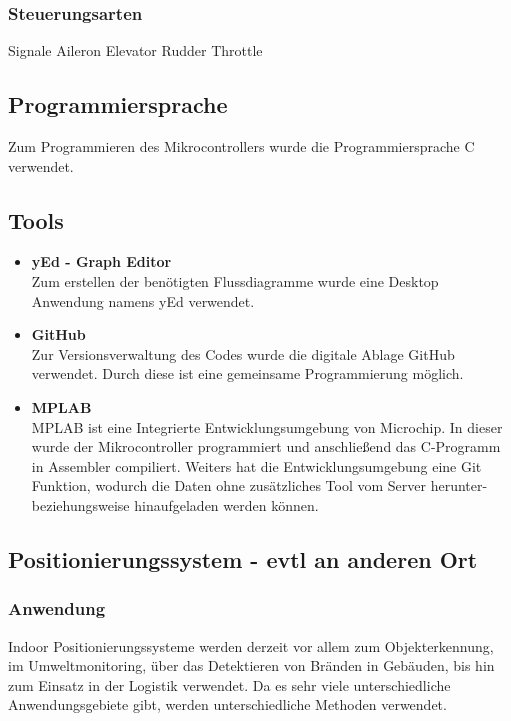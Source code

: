 \begin{itemize}

  \subsubsection{Steuerungsarten} %
  Signale
  Aileron
  Elevator
  Rudder
  Throttle


  \subsection{Programmiersprache}
  Zum Programmieren des Mikrocontrollers wurde die Programmiersprache C verwendet.

  \subsection{Tools}

    \begin{itemize}
      \item \textbf{yEd - Graph Editor}\\
      Zum erstellen der benötigten Flussdiagramme wurde eine Desktop Anwendung namens yEd verwendet.
      \item \textbf{GitHub}\\
      Zur Versionsverwaltung des Codes wurde die digitale Ablage GitHub verwendet. Durch diese ist eine gemeinsame Programmierung möglich.
      \item \textbf{MPLAB}\\
      MPLAB ist eine Integrierte Entwicklungsumgebung von Microchip. In dieser wurde der Mikrocontroller programmiert und anschließend das C-Programm in Assembler compiliert.
      Weiters hat die Entwicklungsumgebung eine Git Funktion, wodurch die Daten ohne zusätzliches Tool vom Server herunter- beziehungsweise hinaufgeladen werden können.
    \end{itemize}


  \subsection{Positionierungssystem - evtl an anderen Ort}

    \subsubsection{Anwendung}
    Indoor Positionierungssysteme werden derzeit vor allem zum Objekterkennung, im Umweltmonitoring, über das Detektieren von Bränden in Gebäuden,
    bis hin zum Einsatz in der Logistik verwendet. Da es sehr viele unterschiedliche Anwendungsgebiete gibt, werden unterschiedliche Methoden verwendet.


\end{itemize}
